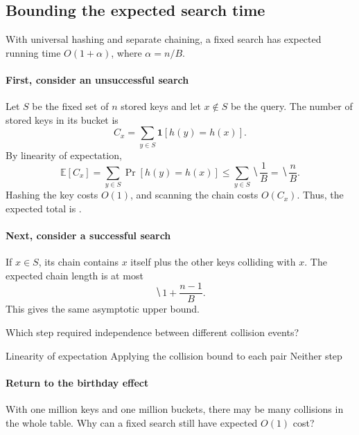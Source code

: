 \documentclass[11pt]{article}
\begin{document}
\newpage
\subsection*{Bounding the expected search time}
\begin{lemma}
    With universal hashing and separate chaining, a fixed search has expected
    running time $O(1+\alpha)$, where $\alpha=n/B$.
\end{lemma}

\paragraph{First, consider an unsuccessful search}
Let $S$ be the fixed set of $n$ stored keys and let $x\notin S$ be the query.
The number of stored keys in its bucket is
\begin{equation*}
    C_x=\sum_{y\in S}\mathbf 1[h(y)=h(x)].
\end{equation*}
By linearity of expectation,
\begin{equation*}
    \mathbb E[C_x]
      =\sum_{y\in S}\Pr[h(y)=h(x)]
      \leq\sum_{y\in S}\hide{\frac1B}
      =\hide{\frac nB}.
\end{equation*}
Hashing the key costs $O(1)$, and scanning the chain costs $O(C_x)$. Thus,
the expected total is .

\paragraph{Next, consider a successful search}
If $x\in S$, its chain contains $x$ itself plus the other keys colliding with
$x$. The expected chain length is at most
\begin{equation*}
    \hide{1+\frac{n-1}{B}}.
\end{equation*}
This gives the same asymptotic upper bound.

\begin{Qu}
    Which step required independence between different collision events?
    \begin{itemize}
        \aitem Linearity of expectation
        \bitem Applying the collision bound to each pair
        \citem Neither step
    \end{itemize}
\end{Qu}

\paragraph{Return to the birthday effect}
With one million keys and one million buckets, there may be many collisions
in the whole table. Why can a fixed search still have expected $O(1)$ cost?
\vs{.7cm}
\end{document}
